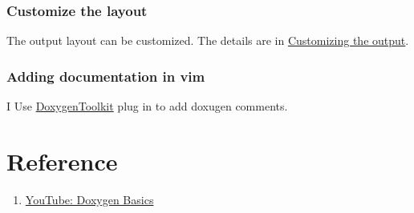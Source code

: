 \subsubsection{Customize the layout}
The output layout can be customized. The details are in \href{https://doxygen.nl/manual/customize.html}{Customizing the output}.

\subsubsection{Adding documentation in vim}
I Use \href{https://github.com/vim-scripts/DoxygenToolkit.vim}{DoxygenToolkit} plug in to add doxugen comments.


\section{Reference}

\begin{enumerate}
  \item \href{https://www.youtube.com/watch?v=TtRn3HsOm1s}{YouTube: Doxygen Basics}
\end{enumerate}
